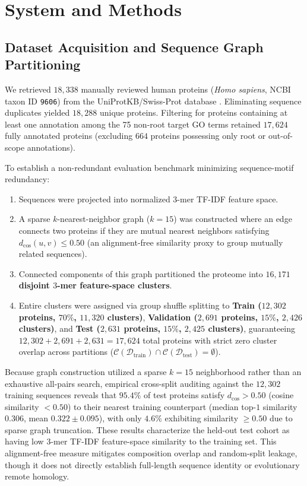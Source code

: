 \documentclass[twocolumn,10pt]{article}
\begin{document}
\section{System and Methods}

\subsection{Dataset Acquisition and Sequence Graph Partitioning}
We retrieved $18,338$ manually reviewed human proteins (\textit{Homo sapiens}, NCBI taxon ID \texttt{9606}) from the UniProtKB/Swiss-Prot database \cite{uniprot2023, bairoch2000swiss}. Eliminating sequence duplicates yielded $18,288$ unique proteins. Filtering for proteins containing at least one annotation among the 75 non-root target GO terms retained $17,624$ fully annotated proteins (excluding $664$ proteins possessing only root or out-of-scope annotations).

To establish a non-redundant evaluation benchmark minimizing sequence-motif redundancy:
\begin{enumerate}
    \item Sequences were projected into normalized $3$-mer TF-IDF feature space.
    \item A sparse $k$-nearest-neighbor graph ($k=15$) was constructed where an edge connects two proteins if they are mutual nearest neighbors satisfying $d_{\cos}(u, v) \le 0.50$ (an alignment-free similarity proxy to group mutually related sequences).
    \item Connected components of this graph partitioned the proteome into \textbf{$16,171$ disjoint $3$-mer feature-space clusters}.
    \item Entire clusters were assigned via group shuffle splitting to \textbf{Train ($12,302$ proteins, $70\%$, $11,320$ clusters)}, \textbf{Validation ($2,691$ proteins, $15\%$, $2,426$ clusters)}, and \textbf{Test ($2,631$ proteins, $15\%$, $2,425$ clusters)}, guaranteeing $12,302 + 2,691 + 2,631 = 17,624$ total proteins with strict zero cluster overlap across partitions ($\mathcal{C}(\mathcal{D}_{\text{train}}) \cap \mathcal{C}(\mathcal{D}_{\text{test}}) = \emptyset$).
\end{enumerate}
Because graph construction utilized a sparse $k=15$ neighborhood rather than an exhaustive all-pairs search, empirical cross-split auditing against the $12,302$ training sequences reveals that $95.4\%$ of test proteins satisfy $d_{\cos} > 0.50$ (cosine similarity $< 0.50$) to their nearest training counterpart (median top-$1$ similarity $0.306$, mean $0.322 \pm 0.095$), with only $4.6\%$ exhibiting similarity $\ge 0.50$ due to sparse graph truncation. These results characterize the held-out test cohort as having low $3$-mer TF-IDF feature-space similarity to the training set. This alignment-free measure mitigates composition overlap and random-split leakage, though it does not directly establish full-length sequence identity or evolutionary remote homology.
\end{document}
